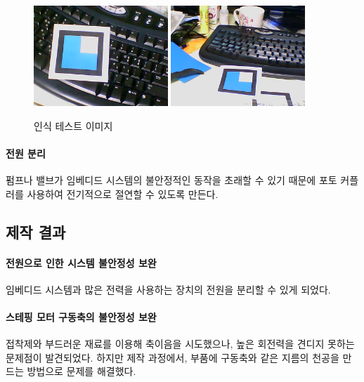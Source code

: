 \documentclass[chapter,11pt,oneside,openany]{xoblivoir}
\begin{document}
\begin{figure}[ht]
\centering
\includegraphics[width=0.45\textwidth]{img/test1}
\hspace{4mm}
\includegraphics[width=0.45\textwidth]{img/test2}
\caption{인식 테스트 이미지}
\label{img:test}
\end{figure}

\paragraph{전원 분리}
펌프나 밸브가 임베디드 시스템의 불안정적인 동작을 초래할 수 있기 때문에
포토 커플러를 사용하여 전기적으로 절연할 수 있도록 만든다.

\subsection{제작 결과}

\paragraph{전원으로 인한 시스템 불안정성 보완}
임베디드 시스템과 많은 전력을 사용하는 장치의 전원을 분리할 수 있게 되었다.

\paragraph{스테핑 모터 구동축의 불안정성 보완}
접착제와 부드러운 재료를 이용해 축이음을 시도했으나, 높은 회전력을 견디지 못하는 문제점이 발견되었다.
하지만 제작 과정에서, 부품에 구동축와 같은 지름의 천공을 만드는 방법으로 문제를 해결했다.
\end{document}
